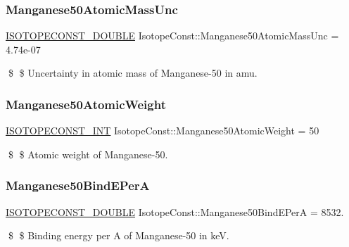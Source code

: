 \subsubsection{\texorpdfstring{Manganese50\+Atomic\+Mass\+Unc}{Manganese50AtomicMassUnc}}
{\footnotesize\ttfamily \mbox{\hyperlink{group___isotope_const-_macros_ga8f45a7272ce02c0b4c65c44636ed719a}{I\+S\+O\+T\+O\+P\+E\+C\+O\+N\+S\+T\+\_\+\+D\+O\+U\+B\+LE}} Isotope\+Const\+::\+Manganese50\+Atomic\+Mass\+Unc = 4.\+74e-\/07}

\$ \$ Uncertainty in atomic mass of Manganese-\/50 in amu. \mbox{\label{group___isotope_const-_manganese-_mn50_ga012324324014e3220c63f3ea198bd2db}} 
\subsubsection{\texorpdfstring{Manganese50\+Atomic\+Weight}{Manganese50AtomicWeight}}
{\footnotesize\ttfamily \mbox{\hyperlink{group___isotope_const-_macros_ga5f18360b3e99483a35c32d789e62621c}{I\+S\+O\+T\+O\+P\+E\+C\+O\+N\+S\+T\+\_\+\+I\+NT}} Isotope\+Const\+::\+Manganese50\+Atomic\+Weight = 50}

\$ \$ Atomic weight of Manganese-\/50. \mbox{\label{group___isotope_const-_manganese-_mn50_ga040bc6379e2e71a7504bfdb4dc5c8cd9}} 
\subsubsection{\texorpdfstring{Manganese50\+Bind\+E\+PerA}{Manganese50BindEPerA}}
{\footnotesize\ttfamily \mbox{\hyperlink{group___isotope_const-_macros_ga8f45a7272ce02c0b4c65c44636ed719a}{I\+S\+O\+T\+O\+P\+E\+C\+O\+N\+S\+T\+\_\+\+D\+O\+U\+B\+LE}} Isotope\+Const\+::\+Manganese50\+Bind\+E\+PerA = 8532.}

\$ \$ Binding energy per A of Manganese-\/50 in keV. \mbox{\label{group___isotope_const-_manganese-_mn50_gabe7006e5a4406fa0fc6c46e5eb3d907c}} 
